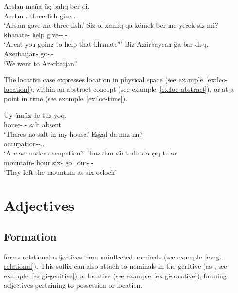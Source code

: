 \begin{lingexample}
	\ex \label{ex:dat-indirect-object} \gll Arslan maña üç balıq ber-di. \\
		Arslan \Fsg{}.\Dat{} three fish give-\Pst{}.\Def{} \\
		\glt `Arslan gave me three fish.'
	\ex \label{ex:dat-verb-complement} \gll Siz ol xanlıq-qa kömek ber-me-yecek-siz mi? \\
		\Spl{} \Dist{} khanate-\Dat{} help give-\Neg{}-\Fut{}.\Def{}-\Spl{} \Q{} \\
		\glt `Aren\apostrophe{}t you going to help that khanate?'
	\ex \label{ex:dat-destination} \gll Biz Azärbaycan-ğa bar-dı-q. \\
		\Fpl{} Azerbaijan-\Dat{} go-\Pst{}.\Def{}-\Fpl{} \\
		\glt `We went to Azerbaijan.'
\end{lingexample}

The locative case expresses location in physical space (see example~\ref{ex:loc-location}), within an abstract concept (see example~\ref{ex:loc-abstract}), or at a point in time (see example~\ref{ex:loc-time}).

\begin{lingexample}
	\ex \label{ex:loc-location} \gll Üy-ümüz-de tuz yoq. \\
		house-\Poss{}.\Fpl{}-\Loc{} salt absent \\
		\glt `There\apostrophe{}s no salt in my house.'
	\ex \label{ex:loc-abstract} \gll Eşğal-da-mız mı? \\
		occupation-\Loc{}-\Cop{}.\Prs{}.\Fpl{} \Q{} \\
		\glt `Are we under occupation?'
	\ex \label{ex:loc-time} \gll Taw-dan sä\apostrophe{}at altı-da çıq-tı-lar. \\
		mountain-\Abl{} hour six-\Loc{} go\_out-\Pst{}.\Def{}-\Tpl{} \\
		\glt `They left the mountain at six o\apostrophe{}clock'
\end{lingexample}

\chapter{Adjectives}

\section{Formation}

 forms relational adjectives from uninflected nominals (see example~\ref{ex:gi-relational}).
This suffix can also attach to nominals in the genitive (as , see example~\ref{ex:gi-genitive}) or locative (see example~\ref{ex:gi-locative}), forming adjectives pertaining to possession or location.

